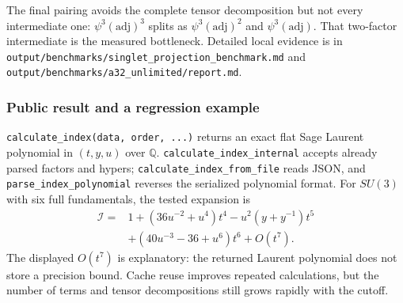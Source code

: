 \documentclass[11pt,a4paper]{article}
\numberwithin{equation}{section}
\newcommand{\code}[1]{{\small\nolinkurl{#1}}}
\newcommand{\adj}{\mathrm{adj}}
\newcommand{\QQ}{\mathbb Q}
\begin{document}
The final pairing avoids the complete tensor decomposition but not every
intermediate one: $\psi^3(\adj)^3$ splits as $\psi^3(\adj)^2$ and
$\psi^3(\adj)$. That two-factor intermediate is the measured bottleneck.
Detailed local evidence is in \code{output/benchmarks/singlet_projection_benchmark.md}
and \code{output/benchmarks/a32_unlimited/report.md}.

\subsubsection{Public result and a regression example}
\code{calculate_index(data, order, ...)} returns an exact flat Sage Laurent
polynomial in $(t,y,u)$ over $\QQ$. \code{calculate_index_internal} accepts already
parsed factors and hypers; \code{calculate_index_from_file} reads JSON, and
\code{parse_index_polynomial} reverses the serialized polynomial format.
For $SU(3)$ with six full fundamentals, the tested expansion is
\begin{equation}
 \begin{split}
 \mathcal I={}&1+(36u^{-2}+u^4)t^4-u^2(y+y^{-1})t^5\\
 &+(40u^{-3}-36+u^6)t^6+O(t^7).
 \end{split}\label{eq:su3-full}
\end{equation}
The displayed $O(t^7)$ is explanatory: the returned Laurent polynomial does not
store a precision bound. Cache reuse improves repeated calculations, but the
number of terms and tensor decompositions still grows rapidly with the cutoff.



\clearpage
\end{document}

